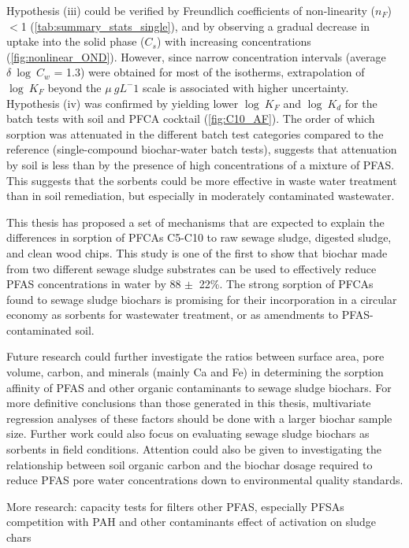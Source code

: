 Hypothesis (iii) could be verified by Freundlich coefficients of non-linearity ($n_F$) $<$1 (\cref{tab:summary_stats_single}), and by observing a gradual decrease in uptake into the solid phase ($C_s$) with increasing concentrations (\cref{fig:nonlinear_OND}). However, since narrow concentration intervals (average $\delta~\log~C_w$ = 1.3) were obtained for most of the isotherms, extrapolation of $\log~K_F$ beyond the $\mu~g L^-1$ scale is associated with higher uncertainty. Hypothesis (iv) was confirmed by yielding lower $\log~K_F$ and $\log~K_d$ for the batch tests with soil and PFCA cocktail (\cref{fig:C10_AF}). The order of which sorption was attenuated in the different batch test categories compared to the reference (single-compound biochar-water batch tests), suggests that attenuation by soil is less than by the presence of high concentrations of a mixture of PFAS. This suggests that the sorbents could be more effective in waste water treatment than in soil remediation, but especially in moderately contaminated wastewater. 

This thesis has proposed a set of mechanisms that are expected to explain the differences in sorption of PFCAs C5-C10 to raw sewage sludge, digested sludge, and clean wood chips. This study is one of the first to show that biochar made from two different sewage sludge substrates can be used to effectively reduce PFAS concentrations in water by 88 $\pm~$ 22\%. The strong sorption of PFCAs found to sewage sludge biochars is promising for their incorporation in a circular economy as sorbents for wastewater treatment, or as amendments to PFAS-contaminated soil. 

Future research could further investigate the ratios between surface area, pore volume, carbon, and minerals (mainly Ca and Fe) in determining the sorption affinity of PFAS and other organic contaminants to sewage sludge biochars. For more definitive conclusions than those generated in this thesis, multivariate regression analyses of these factors should be done with a larger biochar sample size. Further work could also focus on evaluating sewage sludge biochars as sorbents in field conditions. Attention could also be given to investigating the relationship between soil organic carbon and the biochar dosage required to reduce PFAS pore water concentrations down to environmental quality standards. 

More research:
capacity tests for filters
other PFAS, especially PFSAs
competition with PAH and other contaminants
effect of activation on sludge chars

